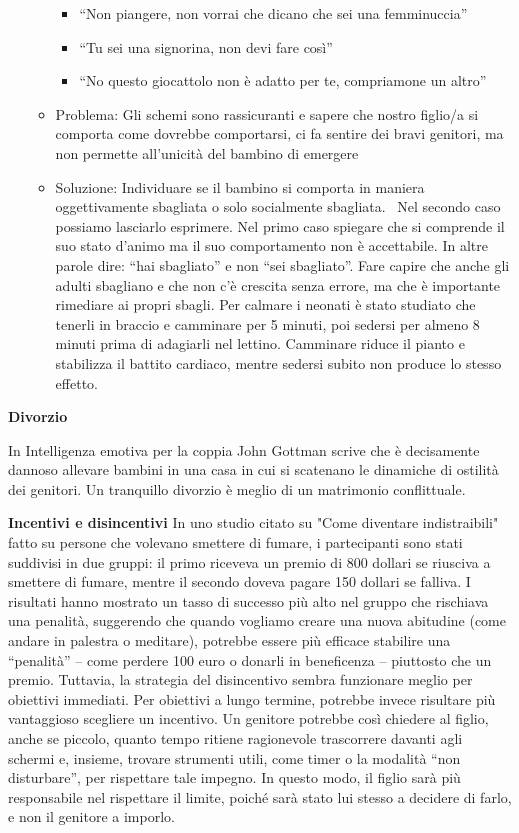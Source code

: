 \documentclass[12pt]{book} %
\begin{document}
\begin{itemize}
\begin{itemize}
\begin{itemize}
\item “Non piangere, non vorrai che dicano che sei una femminuccia”
\item “Tu sei una signorina, non devi fare così”
\item “No questo giocattolo non è adatto per te, compriamone un altro” 
\end{itemize}
\item Problema: Gli schemi sono rassicuranti e sapere che nostro figlio/a si comporta come dovrebbe comportarsi, ci fa
sentire dei bravi genitori, ma non permette all'unicità del bambino di emergere
\item Soluzione: Individuare se il bambino si comporta in maniera oggettivamente sbagliata o solo socialmente sbagliata.
\ Nel secondo caso possiamo lasciarlo esprimere. Nel primo caso spiegare che si comprende il suo stato
d'animo ma il suo comportamento non è accettabile. In altre parole dire: “hai sbagliato” e non
“sei sbagliato”. Fare capire che anche gli adulti sbagliano e che non c'è crescita senza errore, ma che è importante
rimediare ai propri sbagli. Per calmare i neonati è stato studiato che tenerli in braccio e camminare per 5 minuti, poi sedersi per almeno 8 minuti prima di adagiarli nel lettino. Camminare riduce il pianto e stabilizza il battito cardiaco, mentre sedersi subito non produce lo stesso effetto.
\end{itemize}
\end{itemize}

\textbf{Divorzio}

In Intelligenza emotiva per la coppia John Gottman scrive che è
decisamente dannoso allevare bambini in una casa in cui si scatenano le dinamiche di ostilità dei genitori. Un
tranquillo divorzio è meglio di un matrimonio conflittuale. 

\textbf{Incentivi e disincentivi}
In uno studio citato su "Come diventare indistraibili" fatto su persone che volevano smettere di fumare, i partecipanti sono stati suddivisi in due gruppi: il primo riceveva un premio di 800 dollari se riusciva a smettere di fumare, mentre il secondo doveva pagare 150 dollari se falliva. I risultati hanno mostrato un tasso di successo più alto nel gruppo che rischiava una penalità, suggerendo che quando vogliamo creare una nuova abitudine (come andare in palestra o meditare), potrebbe essere più efficace stabilire una “penalità” – come perdere 100 euro o donarli in beneficenza – piuttosto che un premio. Tuttavia, la strategia del disincentivo sembra funzionare meglio per obiettivi immediati. Per obiettivi a lungo termine, potrebbe invece risultare più vantaggioso scegliere un incentivo.
Un genitore potrebbe così chiedere al figlio, anche se piccolo, quanto tempo ritiene ragionevole trascorrere davanti agli schermi e, insieme, trovare strumenti utili, come timer o la modalità “non disturbare”, per rispettare tale impegno. In questo modo, il figlio sarà più responsabile nel rispettare il limite, poiché sarà stato lui stesso a decidere di farlo, e non il genitore a imporlo.
\end{document}
